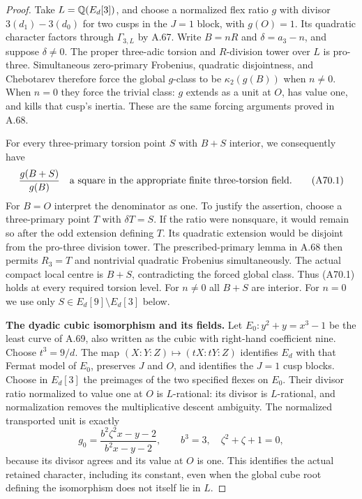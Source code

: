 \begin{proof}
Take $L=\mathbb Q(E_d[3])$, and choose a normalized flex
ratio $g$ with divisor $3(d_1)-3(d_0)$ for two
cusps in the $J=1$ block, with $g(O)=1$.
Its quadratic character factors through
$\Gamma_{3,L}$ by A.67. Write $B=nR$ and
$\delta=a_3-n$, and suppose $\delta\ne0$.
The proper three-adic torsion and $R$-division
tower over $L$ is pro-three. Simultaneous
zero-primary Frobenius, quadratic disjointness,
and Chebotarev therefore force the global
$g$-class to be $\kappa_2(g(B))$ when $n\ne0$.
When $n=0$ they force the trivial class:
$g$ extends as a unit at $O$, has value one,
and kills that cusp's inertia. These are the
same forcing arguments proved in A.68.

For every three-primary torsion point $S$
with $B+S$ interior, we consequently have
\[
 \frac{g(B+S)}{g(B)}\quad\hbox{a square in the
 appropriate finite three-torsion field}.
 \tag{A70.1}
\]
For $B=O$ interpret the denominator as one.
To justify the assertion, choose a three-primary
point $T$ with $\delta T=S$. If the ratio were
nonsquare, it would remain so after the odd
extension defining $T$. Its quadratic extension
would be disjoint from the pro-three division
tower. The prescribed-primary lemma in A.68
then permits $R_3=T$ and nontrivial quadratic
Frobenius simultaneously. The actual compact
local centre is $B+S$, contradicting the forced
global class. Thus (A70.1) holds at every
required torsion level. For $n\ne0$ all
$B+S$ are interior. For $n=0$ we use only
$S\in E_d[9]\setminus E_d[3]$ below.

\par\smallskip\noindent\textbf{The dyadic cubic isomorphism and its fields.}\enspace
Let $E_0:y^2+y=x^3-1$ be the least curve of
A.69, also written as the cubic with right-hand
coefficient nine. Choose $t^3=9/d$.
The map $(X:Y:Z)\mapsto(tX:tY:Z)$ identifies
$E_d$ with that Fermat model of $E_0$,
preserves $J$ and $O$, and identifies the
$J=1$ cusp blocks. Choose in $E_d[3]$ the
preimages of the two specified flexes on
$E_0$. Their divisor ratio normalized to
value one at $O$ is $L$-rational: its
divisor is $L$-rational, and normalization
removes the multiplicative descent
ambiguity. The normalized transported
unit is exactly
\[
 g_0=\frac{b^2\zeta^2x-y-2}{b^2x-y-2},
 \qquad b^3=3,\quad\zeta^2+\zeta+1=0,
 \tag{A70.2}
\]
because its divisor agrees and its value
at $O$ is one. This identifies the actual
retained character, including its constant,
even when the global cube root defining
the isomorphism does not itself lie in $L$.


\end{proof}
